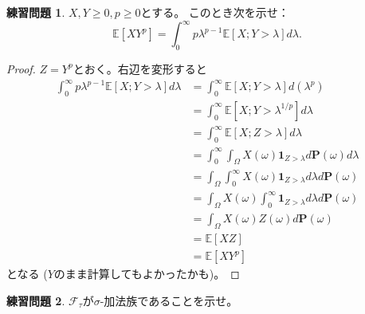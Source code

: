 \documentclass[uplatex]{jsarticle}
\theoremstyle{definition}
\newtheorem{prob}[prob]{練習問題}
\def\P{\mathbf{P}}
\def\E{\mathbb{E}}
\def\I{\mathbf{1}}
\def\mcF{\mathcal{F}}
\begin{document}
\begin{prob}\label{prob: 2.4}
  \(X,Y \geq 0, p\geq 0\)とする。
  このとき次を示せ：
  \[
  \E\left[ XY^p \right] = \int_0^\infty p\lambda^{p-1}
  \E\left[ X;Y>\lambda \right] d\lambda.
  \]
\end{prob}

\begin{proof}
  \(Z = Y^p\)とおく。右辺を変形すると
  \begin{align*}
    \int_0^\infty p\lambda^{p-1}
    \E\left[ X;Y>\lambda \right] d\lambda
    &= \int_0^\infty \E\left[ X;Y>\lambda \right] d(\lambda^p) \\
    &= \int_0^\infty \E\left[ X;Y>\lambda^{1/p} \right] d\lambda \\
    &= \int_0^\infty \E\left[ X;Z>\lambda \right] d\lambda \\
    &= \int_0^\infty \int_{\Omega}X(\omega)\I_{Z>\lambda} d\P(\omega) d\lambda \\
    &= \int_{\Omega}\int_0^\infty X(\omega)\I_{Z>\lambda} d\lambda d\P(\omega) \\
    &= \int_{\Omega}X(\omega)\int_0^\infty \I_{Z>\lambda} d\lambda d\P(\omega) \\
    &= \int_{\Omega}X(\omega)Z(\omega) d\P(\omega) \\
    &= \E[XZ] \\
    &= \E[XY^p]
  \end{align*}
  となる (\(Y\)のまま計算してもよかったかも)。
\end{proof}















\begin{prob}\label{prob: 2.5}
  \(\mcF_{\tau}\)が\(\sigma\)-加法族であることを示せ。
\end{prob}
\end{document}
